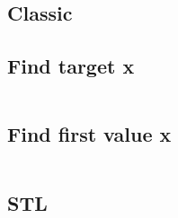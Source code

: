 \subsection{Classic}
    \subsection{Find target x}
        \inputminted{cpp}{BinarySearch/Code/findTarget.cpp}
    \subsection{Find first value x}
        \inputminted{cpp}{BinarySearch/Code/firstValueGEx.cpp}
\subsection{STL}